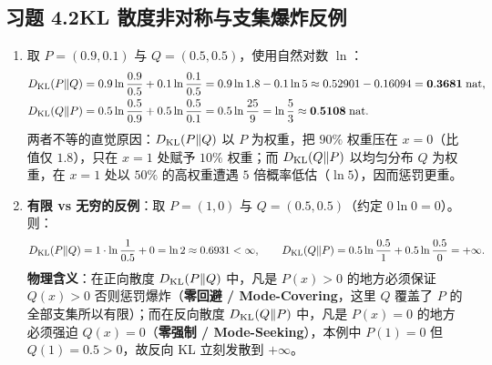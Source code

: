 \subsection*{习题 4.2\quad KL 散度非对称与支集爆炸反例}
\begin{enumerate}[label=(\arabic*), leftmargin=1.8em]
  \item 取 $P = (0.9, 0.1)$ 与 $Q = (0.5, 0.5)$，使用自然对数 $\ln$：
  \begin{align*}
    D_{\mathrm{KL}}(P\|Q) &= 0.9\ln\frac{0.9}{0.5} + 0.1\ln\frac{0.1}{0.5}
                = 0.9\ln 1.8 - 0.1\ln 5 \approx 0.52901 - 0.16094 = \mathbf{0.3681}\;\text{nat}, \\
    D_{\mathrm{KL}}(Q\|P) &= 0.5\ln\frac{0.5}{0.9} + 0.5\ln\frac{0.5}{0.1}
                = 0.5\ln\frac{25}{9} = \ln\frac{5}{3} \approx \mathbf{0.5108}\;\text{nat}.
  \end{align*}
  两者不等的直觉原因：$D_{\mathrm{KL}}(P\|Q)$ 以 $P$ 为权重，把 $90\%$ 权重压在 $x=0$（比值仅 $1.8$），只在 $x=1$ 处赋予 $10\%$ 权重；而 $D_{\mathrm{KL}}(Q\|P)$ 以均匀分布 $Q$ 为权重，在 $x=1$ 处以 $50\%$ 的高权重遭遇 $5$ 倍概率低估（$\ln 5$），因而惩罚更重。
  \item \textbf{有限 vs 无穷的反例}：取 $P = (1, 0)$ 与 $Q = (0.5, 0.5)$（约定 $0\ln 0 = 0$）。则：
  \[
    D_{\mathrm{KL}}(P\|Q) = 1\cdot\ln\frac{1}{0.5} + 0 = \ln 2 \approx 0.6931 < \infty,
    \qquad
    D_{\mathrm{KL}}(Q\|P) = 0.5\ln\frac{0.5}{1} + 0.5\ln\frac{0.5}{0} = +\infty.
  \]
  \textbf{物理含义}：在正向散度 $D_{\mathrm{KL}}(P\|Q)$ 中，凡是 $P(x) > 0$ 的地方必须保证 $Q(x) > 0$ 否则惩罚爆炸（\textbf{零回避 / Mode-Covering}，这里 $Q$ 覆盖了 $P$ 的全部支集所以有限）；而在反向散度 $D_{\mathrm{KL}}(Q\|P)$ 中，凡是 $P(x) = 0$ 的地方必须强迫 $Q(x) = 0$（\textbf{零强制 / Mode-Seeking}），本例中 $P(1)=0$ 但 $Q(1)=0.5>0$，故反向 KL 立刻发散到 $+\infty$。
\end{enumerate}

